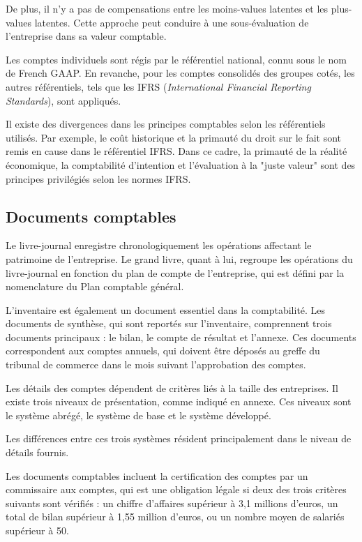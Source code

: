 \documentclass[a4paper, 12pt]{report}
\begin{document}
De plus, il n'y a pas de compensations entre les moins-values latentes et les plus-values latentes. Cette approche peut conduire à une sous-évaluation de l'entreprise dans sa valeur comptable.

Les comptes individuels sont régis par le référentiel national, connu sous le nom de French GAAP. En revanche, pour les comptes consolidés des groupes cotés, les autres référentiels, tels que les IFRS (\textit{International Financial Reporting Standards}), sont appliqués.

Il existe des divergences dans les principes comptables selon les référentiels utilisés. Par exemple, le coût historique et la primauté du droit sur le fait sont remis en cause dans le référentiel IFRS. Dans ce cadre, la primauté de la réalité économique, la comptabilité d'intention et l'évaluation à la "juste valeur" sont des principes privilégiés selon les normes IFRS.

\subsection{Documents comptables}

Le livre-journal enregistre chronologiquement les opérations affectant le patrimoine de l'entreprise. Le grand livre, quant à lui, regroupe les opérations du livre-journal en fonction du plan de compte de l'entreprise, qui est défini par la nomenclature du Plan comptable général.

L'inventaire est également un document essentiel dans la comptabilité. Les documents de synthèse, qui sont reportés sur l'inventaire, comprennent trois documents principaux : le bilan, le compte de résultat et l'annexe. Ces documents correspondent aux comptes annuels, qui doivent être déposés au greffe du tribunal de commerce dans le mois suivant l'approbation des comptes.

Les détails des comptes dépendent de critères liés à la taille des entreprises. Il existe trois niveaux de présentation, comme indiqué en annexe. Ces niveaux sont le système abrégé, le système de base et le système développé. 

Les différences entre ces trois systèmes résident principalement dans le niveau de détails fournis. 

Les documents comptables incluent la certification des comptes par un commissaire aux comptes, qui est une obligation légale si deux des trois critères suivants sont vérifiés : un chiffre d'affaires supérieur à 3,1 millions d'euros, un total de bilan supérieur à 1,55 million d'euros, ou un nombre moyen de salariés supérieur à 50.
\end{document}
